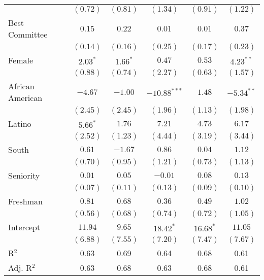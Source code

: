 \documentclass[12pt]{article}
\begin{document}
\begin{table}[H]
\begin{threeparttable}
\begin{tabular}{l c c c c c }
                      & $(0.72)$      & $(0.81)$     & $(1.34)$       & $(0.91)$     & $(1.22)$     \\
Best Committee        & $0.15$        & $0.22$       & $0.01$         & $0.01$       & $0.37$       \\
                      & $(0.14)$      & $(0.16)$     & $(0.25)$       & $(0.17)$     & $(0.23)$     \\
Female                & $2.03^{*}$    & $1.66^{*}$   & $0.47$         & $0.53$       & $4.23^{**}$  \\
                      & $(0.88)$      & $(0.74)$     & $(2.27)$       & $(0.63)$     & $(1.57)$     \\
African American      & $-4.67$       & $-1.00$      & $-10.88^{***}$ & $1.48$       & $-5.34^{**}$ \\
                      & $(2.45)$      & $(2.45)$     & $(1.96)$       & $(1.13)$     & $(1.98)$     \\
Latino                & $5.66^{*}$    & $1.76$       & $7.21$         & $4.73$       & $6.17$       \\
                      & $(2.52)$      & $(1.23)$     & $(4.44)$       & $(3.19)$     & $(3.44)$     \\
South                 & $0.61$        & $-1.67$      & $0.86$         & $0.04$       & $1.12$       \\
                      & $(0.70)$      & $(0.95)$     & $(1.21)$       & $(0.73)$     & $(1.13)$     \\
Seniority             & $0.01$        & $0.05$       & $-0.01$        & $0.08$       & $0.13$       \\
                      & $(0.07)$      & $(0.11)$     & $(0.13)$       & $(0.09)$     & $(0.10)$     \\
Freshman              & $0.81$        & $0.68$       & $0.36$         & $0.49$       & $1.02$       \\
                      & $(0.56)$      & $(0.68)$     & $(0.74)$       & $(0.72)$     & $(1.05)$     \\
Intercept             & $11.94$       & $9.65$       & $18.42^{*}$    & $16.68^{*}$  & $11.05$      \\
                      & $(6.88)$      & $(7.55)$     & $(7.20)$       & $(7.47)$     & $(7.67)$     \\
\hline
R$^2$                 & 0.63          & 0.69         & 0.64           & 0.68         & 0.61         \\
Adj. R$^2$            & 0.63          & 0.68         & 0.63           & 0.68         & 0.61         \\

\end{tabular}
\end{threeparttable}
\end{table}
\end{document}
